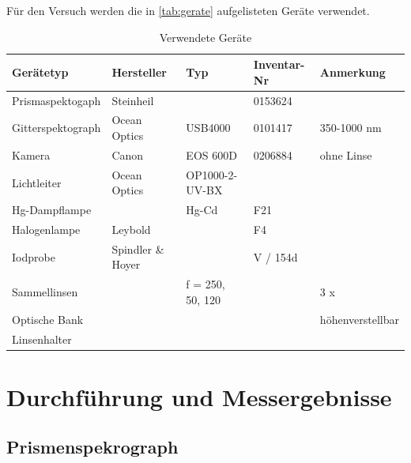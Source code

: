 \documentclass[12pt,english,ngerman]{scrartcl}
\begin{document}
Für den Versuch werden die in \autoref{tab:gerate} aufgelisteten Geräte verwendet.

\begin{table}[H]
	\caption{Verwendete Geräte}
	\begin{tabular}{|l|l|l|l|l|}
	\hline
	\textbf{Gerätetyp} & \textbf{Hersteller} & \textbf{Typ}     & \textbf{Inventar-Nr} & \textbf{Anmerkung} \\ \hline
	Prismaspektogaph   & Steinheil           &                  & 0153624              &                    \\ \hline
	Gitterspektograph  & Ocean Optics        & USB4000          & 0101417              & 350-1000 nm        \\ \hline
	Kamera             & Canon               & EOS 600D         & 0206884              & ohne Linse         \\ \hline
	Lichtleiter        & Ocean Optics        & OP1000-2-UV-BX   &                      &                    \\ \hline
	Hg-Dampflampe      &                     & Hg-Cd            & F21                  &                    \\ \hline
	Halogenlampe       & Leybold             &                  & F4                   &                    \\ \hline
	Iodprobe           & Spindler \& Hoyer   &                  & V / 154d             &                    \\ \hline
	Sammellinsen       &                     & f = 250, 50, 120 &   & 3 x                \\ \hline
	Optische Bank      &                     &                  &                      & höhenverstellbar   \\ \hline
	Linsenhalter       &                     &                  &                      &                    \\ \hline
	\end{tabular}
	\label{tab:gerate}
	\end{table}


\section{Durchführung und Messergebnisse}\label{sec:durchfuhrung}

\subsection{Prismenspekrograph}
\end{document}

